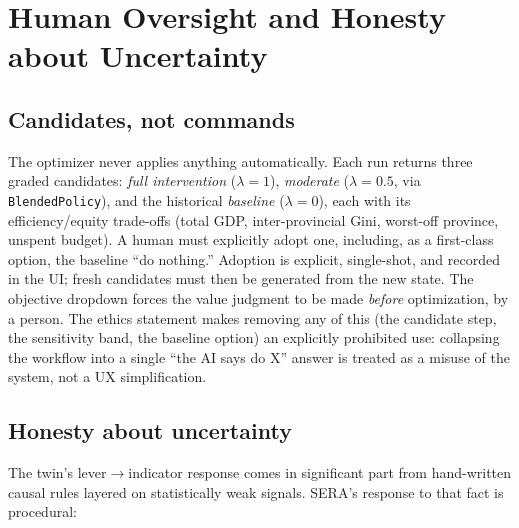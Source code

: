 \documentclass[11pt,a4paper]{article}
\newcommand{\code}[1]{\texttt{#1}}
\begin{document}
\section{Human Oversight and Honesty about Uncertainty}
\label{sec:oversight}

\subsection{Candidates, not commands}

The optimizer never applies anything automatically. Each run returns three
graded candidates: \emph{full intervention} ($\lambda=1$), \emph{moderate}
($\lambda=0.5$, via \code{BlendedPolicy}), and the historical \emph{baseline}
($\lambda=0$), each with its efficiency/equity trade-offs (total GDP,
inter-provincial Gini, worst-off province, unspent budget). A human must
explicitly adopt one, including, as a first-class option, the baseline ``do
nothing.'' Adoption is explicit, single-shot, and recorded in the UI; fresh
candidates must then be generated from the new state. The objective dropdown
forces the value judgment to be made \emph{before} optimization, by a person.
The ethics statement makes removing any of this (the candidate step, the
sensitivity band, the baseline option) an explicitly prohibited use:
collapsing the workflow into a single ``the AI says do X'' answer is treated
as a misuse of the system, not a UX simplification.

\subsection{Honesty about uncertainty}
\label{sec:uncertainty}

The twin's lever$\to$indicator response comes in significant part from
hand-written causal rules layered on statistically weak signals. SERA's
response to that fact is procedural:
\end{document}
